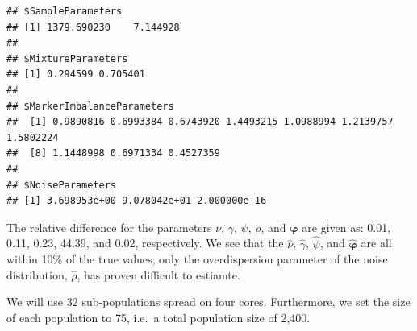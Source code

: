 \documentclass[]{article}
\newenvironment{Shaded}{\begin{snugshade}}{\end{snugshade}}
\newcommand{\DecValTok}[1]{\textcolor[rgb]{0.00,0.00,0.81}{#1}}
\newcommand{\StringTok}[1]{\textcolor[rgb]{0.31,0.60,0.02}{#1}}
\newcommand{\OperatorTok}[1]{\textcolor[rgb]{0.81,0.36,0.00}{\textbf{#1}}}
\newcommand{\NormalTok}[1]{#1}
\newcommand{\bs}[1]{\ensuremath{\boldsymbol{#1}}}
\begin{document}
\begin{Shaded}
\end{Shaded}

\begin{verbatim}
## $SampleParameters
## [1] 1379.690230    7.144928
## 
## $MixtureParameters
## [1] 0.294599 0.705401
## 
## $MarkerImbalanceParameters
##  [1] 0.9890816 0.6993384 0.6743920 1.4493215 1.0988994 1.2139757 1.5802224
##  [8] 1.1448998 0.6971334 0.4527359
## 
## $NoiseParameters
## [1] 3.698953e+00 9.078042e+01 2.000000e-16
\end{verbatim}

The relative difference for the parameters \(\nu\), \(\gamma\),
\(\psi\), \(\rho\), and \(\bs \varphi\) are given as: 0.01, 0.11, 0.23,
44.39, and 0.02, respectively. We see that the \(\hat \nu\),
\(\hat \gamma\), \(\hat \psi\), and \(\hat{\bs \varphi}\) are all within
10\% of the true values, only the overdispersion parameter of the noise
distribution, \(\hat \rho\), has proven difficult to estiamte.

We will use 32 sub-populations spread on four cores. Furthermore, we set
the size of each population to 75, i.e.~a total population size of
2,400.
\end{document}
